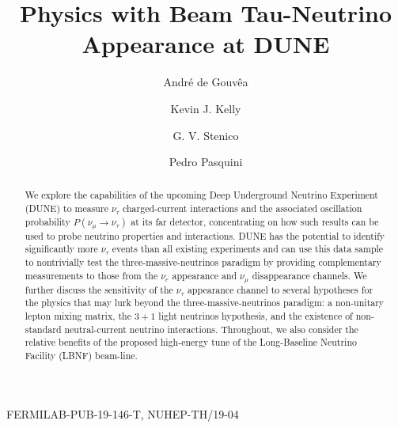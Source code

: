 \documentclass[aps,prd,onecolumn,nofootinbib,superscriptaddress, 11pt]{revtex4}
\begin{document}
\singlespacing
\allowdisplaybreaks

{\hfill FERMILAB-PUB-19-146-T, NUHEP-TH/19-04}

\title{Physics with Beam Tau-Neutrino Appearance at DUNE}

\author{Andr\'{e} de Gouv\^{e}a} 
\author{Kevin J. Kelly}
\author{G. V. Stenico}
\author{Pedro Pasquini}

\begin{abstract}
We explore the capabilities of the upcoming Deep Underground Neutrino Experiment (DUNE) to measure $\nu_\tau$ charged-current interactions and the associated oscillation probability $P(\nu_\mu \to \nu_\tau)$ at its far detector, concentrating on how such results can be used to probe neutrino properties and interactions. DUNE has the potential to identify significantly more $\nu_\tau$ events than all existing experiments and can use this data sample to nontrivially test the three-massive-neutrinos paradigm by providing complementary measurements to those from the $\nu_e$ appearance and $\nu_\mu$ disappearance channels. We further discuss the sensitivity of the $\nu_\tau$ appearance channel to several hypotheses for the physics that may lurk beyond the three-massive-neutrinos paradigm: a non-unitary lepton mixing matrix, the $3+1$ light neutrinos hypothesis, and the existence of non-standard neutral-current neutrino interactions. Throughout, we also consider the relative benefits of the proposed high-energy tune of the Long-Baseline Neutrino Facility (LBNF) beam-line.
\end{abstract}


\maketitle
\end{document}
